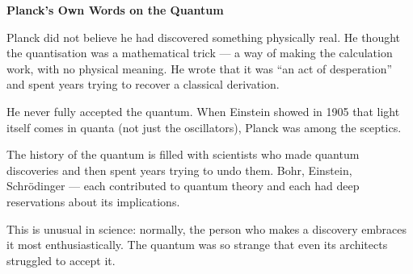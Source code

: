 \documentclass[12pt, a4paper]{book}
\begin{document}
\begin{historybox}
\textbf{Planck's Own Words on the Quantum}

Planck did not believe he had discovered something physically real.
He thought the quantisation was a mathematical trick ---
a way of making the calculation work, with no physical meaning.
He wrote that it was ``an act of desperation'' and spent years
trying to recover a classical derivation.

He never fully accepted the quantum.
When Einstein showed in 1905 that light itself comes in quanta
(not just the oscillators), Planck was among the sceptics.

The history of the quantum is filled with scientists who
made quantum discoveries and then spent years trying to
undo them.
Bohr, Einstein, Schr\"{o}dinger --- each contributed to quantum
theory and each had deep reservations about its implications.

This is unusual in science: normally, the person who
makes a discovery embraces it most enthusiastically.
The quantum was so strange that even its architects
struggled to accept it.
\end{historybox}
\end{document}
